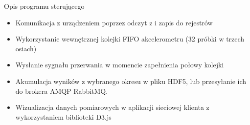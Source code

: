 \documentclass[aspectratio=1610,polish]{beamer} %
\begin{document}
  \begin{frame}{Opis programu sterującego}
      \begin{itemize}
        \item Komunikacja z urządzeniem poprzez odczyt z i zapis do rejestrów
        \item Wykorzystanie wewnętrznej kolejki FIFO akcelerometru (32 próbki w trzech osiach)
        \item Wysłanie sygnału przerwania w momencie zapełnienia połowy kolejki
        \item Akumulacja wyników z wybranego okresu w pliku HDF5, lub
	  przesyłanie ich do brokera AMQP RabbitMQ.
	\item Wizualizacja danych pomiarowych w aplikacji sieciowej klienta z
	  wykorzystaniem biblioteki D3.js
      \end{itemize}
  \end{frame}
  
\end{document}
